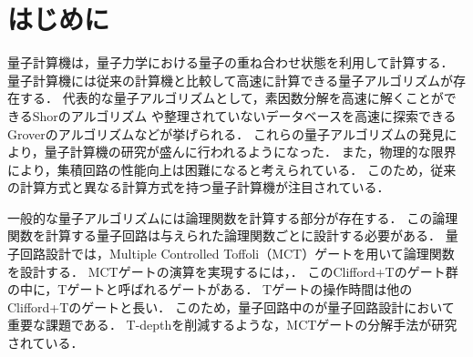 \chapter{はじめに}

    量子計算機は，量子力学における量子の重ね合わせ状態を利用して計算する\cite{nielsen2010quantum}．
    量子計算機には従来の計算機と比較して高速に計算できる量子アルゴリズムが存在する．
    代表的な量子アルゴリズムとして，素因数分解を高速に解くことができるShorのアルゴリズム\cite{shor1999polynomial}
    や整理されていないデータベースを高速に探索できるGroverのアルゴリズム\cite{grover1996fast}などが挙げられる．
    これらの量子アルゴリズムの発見により，量子計算機の研究が盛んに行われるようになった．
    また，物理的な限界により，集積回路の性能向上は困難になると考えられている\cite{2015Inte81:online}．
    このため，従来の計算方式と異なる計算方式を持つ量子計算機が注目されている．
    \par
    一般的な量子アルゴリズムには論理関数を計算する部分が存在する\cite{yamashita2008ddmf}．
    この論理関数を計算する量子回路は与えられた論理関数ごとに設計する必要がある．
    量子回路設計では，Multiple Controlled Toffoli（MCT）ゲート\cite{barenco1995elementary}を用いて論理関数を設計する．
    MCTゲートの演算を実現するには，\cite{zhou2000methodology}．
    このClifford+Tのゲート群の中に，Tゲートと呼ばれるゲートがある．
    Tゲートの操作時間は他のClifford+Tのゲートと長い\cite{fowler2009high}．
    このため，量子回路中のが量子回路設計において重要な課題である\cite{amy2013meet,miller2014mapping,selinger2013quantum}．
    T-depthを削減するような，MCTゲートの分解手法が研究されている\cite{abdessaied2016technology,niemann2019t,baker2019decomposing}．

